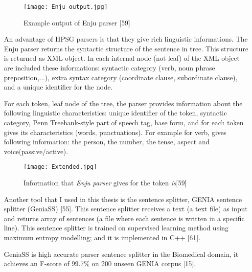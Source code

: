 \begin{figure}[h]
  \begin{center}
	\texttt{[image: Enju\_output.jpg]} 
 	\caption[Example output of Enju parser]{Example output of Enju parser [59] }
	\label{Figure 6}
  \end{center}
\end{figure}

An advantage of HPSG parsers is that they give rich linguistic informations. The Enju parser returns the syntactic structure of the sentence in tree. This structure is returned as XML object. In each internal node (not leaf) of the XML object are included these informations: syntactic category (verb, noun phrase preposition,...), extra syntax category (coordinate clause, subordinate clause), and a unique identifier for the node. 

For each token, leaf node of the tree, the parser provides information about the following linguistic characteristics: unique identifier of the token, syntactic category, Penn Treebank-style part of speech tag, base form, and for each token gives its characteristics (words, punctuations). For example for verb, gives following information: the person, the number, the tense, aspect and voice(passive/active). 
\begin{figure}[h]
   \begin{center}
		\texttt{[image: Extended.jpg]} 
 		\caption[Information that \emph{Enju parser} gives for the token \emph{is}]{Information that \emph{Enju parser} gives for the token \emph{is}[59]}
		\label{Figure 7}
	\end{center}
\end{figure}
 
Another tool that I used in this thesis is the sentence splitter, GENIA sentence splitter (GeniaSS) [55]. This sentence splitter receives a text (a text file) as input and returns array of sentences (a file where each sentence is written in a specific line). This sentence splitter is trained on supervised learning method using maximum entropy modelling; and it is implemented in C++ [61]. 

GeniaSS is high accurate parser sentence splitter in the Biomedical domain, it achieves an F-score of 99.7\% on 200 unseen GENIA corpus [15].
